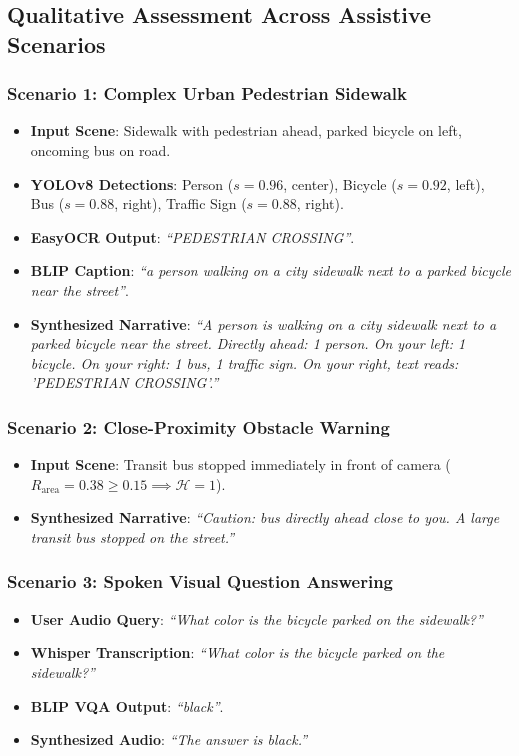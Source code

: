 \documentclass[conference]{IEEEtran}
\begin{document}
\subsection{Qualitative Assessment Across Assistive Scenarios}

\subsubsection{Scenario 1: Complex Urban Pedestrian Sidewalk}
\begin{itemize}
    \item \textbf{Input Scene}: Sidewalk with pedestrian ahead, parked bicycle on left, oncoming bus on road.
    \item \textbf{YOLOv8 Detections}: Person ($s=0.96$, center), Bicycle ($s=0.92$, left), Bus ($s=0.88$, right), Traffic Sign ($s=0.88$, right).
    \item \textbf{EasyOCR Output}: \textit{``PEDESTRIAN CROSSING''}.
    \item \textbf{BLIP Caption}: \textit{``a person walking on a city sidewalk next to a parked bicycle near the street''}.
    \item \textbf{Synthesized Narrative}: \textit{``A person is walking on a city sidewalk next to a parked bicycle near the street. Directly ahead: 1 person. On your left: 1 bicycle. On your right: 1 bus, 1 traffic sign. On your right, text reads: 'PEDESTRIAN CROSSING'.''}
\end{itemize}

\subsubsection{Scenario 2: Close-Proximity Obstacle Warning}
\begin{itemize}
    \item \textbf{Input Scene}: Transit bus stopped immediately in front of camera ($R_{\text{area}} = 0.38 \ge 0.15 \implies \mathcal{H} = 1$).
    \item \textbf{Synthesized Narrative}: \textit{``Caution: bus directly ahead close to you. A large transit bus stopped on the street.''}
\end{itemize}

\subsubsection{Scenario 3: Spoken Visual Question Answering}
\begin{itemize}
    \item \textbf{User Audio Query}: \textit{``What color is the bicycle parked on the sidewalk?''}
    \item \textbf{Whisper Transcription}: \textit{``What color is the bicycle parked on the sidewalk?''}
    \item \textbf{BLIP VQA Output}: \textit{``black''}.
    \item \textbf{Synthesized Audio}: \textit{``The answer is black.''}
\end{itemize}
\end{document}
